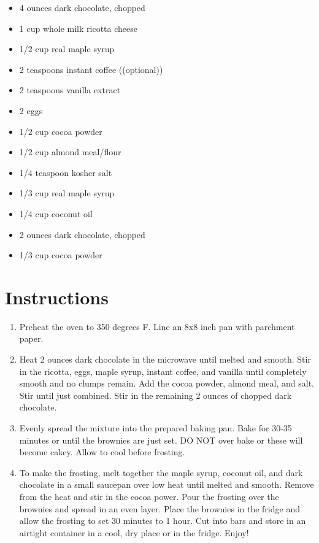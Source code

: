 \documentclass[
  letterpaper,
  DIV=11,
  numbers=noendperiod,
  titlepage=false]{scrreprt}
\providecommand{\tightlist}{%
  \setlength{\itemsep}{0pt}\setlength{\parskip}{0pt}}\usepackage{longtable,booktabs,array}
\begin{document}
\begin{itemize}
\tightlist
\item
  4 ounces dark chocolate, chopped
\item
  1 cup whole milk ricotta cheese
\item
  1/2 cup real maple syrup
\item
  2 teaspoons instant coffee ((optional))
\item
  2 teaspoons vanilla extract
\item
  2 eggs
\item
  1/2 cup cocoa powder
\item
  1/2 cup almond meal/flour
\item
  1/4 teaspoon kosher salt
\item
  1/3 cup real maple syrup
\item
  1/4 cup coconut oil
\item
  2 ounces dark chocolate, chopped
\item
  1/3 cup cocoa powder
\end{itemize}

\section{Instructions}\label{instructions-32}

\begin{enumerate}
\def\labelenumi{\arabic{enumi}.}
\tightlist
\item
  Preheat the oven to 350 degrees F. Line an 8x8 inch pan with parchment
  paper.
\item
  Heat 2 ounces dark chocolate in the microwave until melted and smooth.
  Stir in the ricotta, eggs, maple syrup, instant coffee, and vanilla
  until completely smooth and no clumps remain. Add the cocoa powder,
  almond meal, and salt. Stir until just combined. Stir in the remaining
  2 ounces of chopped dark chocolate.
\item
  Evenly spread the mixture into the prepared baking pan. Bake for 30-35
  minutes or until the brownies are just set. DO NOT over bake or these
  will become cakey. Allow to cool before frosting.
\item
  To make the frosting, melt together the maple syrup, coconut oil, and
  dark chocolate in a small saucepan over low heat until melted and
  smooth. Remove from the heat and stir in the cocoa power. Pour the
  frosting over the brownies and spread in an even layer. Place the
  brownies in the fridge and allow the frosting to set 30 minutes to 1
  hour. Cut into bars and store in an airtight container in a cool, dry
  place or in the fridge. Enjoy!
\end{enumerate}
\end{document}
